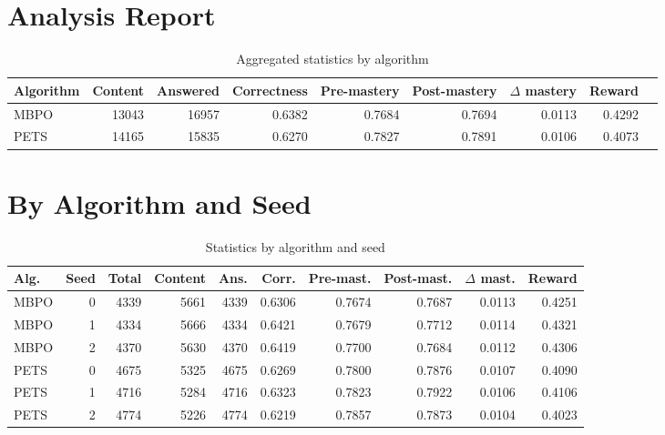 \documentclass[preprint,12pt]{elsarticle}
\begin{document}
\begin{frontmatter}
\section*{Analysis Report}
\bigskip
\begin{table}[ht]
\centering
\small
\caption{Aggregated statistics by algorithm}
\label{tab:agg_by_algo}
\begin{tabularx}{\textwidth}{lrrrrrrrr}
\toprule
Algorithm &
Content &
Answered &
Correctness &
Pre-mastery &
Post-mastery &
$\Delta$ mastery &
Reward \\
\midrule
MBPO & 13043 & 16957 & 0.6382 & 0.7684 & 0.7694 & 0.0113 & 0.4292 \\
PETS & 14165 & 15835 & 0.6270 & 0.7827 & 0.7891 & 0.0106 & 0.4073 \\
\bottomrule
\end{tabularx}
\end{table}


\section*{By Algorithm and Seed}
\begin{table}[ht]
\centering
\scriptsize
\caption{Statistics by algorithm and seed}
\label{tab:stats_algo_seed}
\setlength{\tabcolsep}{3pt}
\begin{tabular}{lrrrrrrrrr}
\hline
Alg. & Seed & Total & Content & Ans. & Corr. &
Pre-mast. & Post-mast. & $\Delta$ mast. & Reward \\
\hline
MBPO & 0 & 4339 & 5661 & 4339 & 0.6306 & 0.7674 & 0.7687 & 0.0113 & 0.4251 \\
MBPO & 1 & 4334 & 5666 & 4334 & 0.6421 & 0.7679 & 0.7712 & 0.0114 & 0.4321 \\
MBPO & 2 & 4370 & 5630 & 4370 & 0.6419 & 0.7700 & 0.7684 & 0.0112 & 0.4306 \\
PETS & 0 & 4675 & 5325 & 4675 & 0.6269 & 0.7800 & 0.7876 & 0.0107 & 0.4090 \\
PETS & 1 & 4716 & 5284 & 4716 & 0.6323 & 0.7823 & 0.7922 & 0.0106 & 0.4106 \\
PETS & 2 & 4774 & 5226 & 4774 & 0.6219 & 0.7857 & 0.7873 & 0.0104 & 0.4023 \\
\hline
\end{tabular}
\end{table}




\end{frontmatter}
\end{document}
